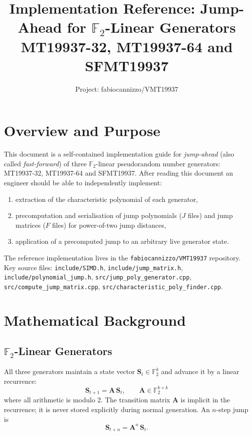 \documentclass{article}
\title{Implementation Reference: Jump-Ahead for $\mathbb{F}_2$-Linear Generators\\
\large MT19937-32, MT19937-64 and SFMT19937}
\author{Project: fabiocannizzo/VMT19937}
\date{}
\begin{document}
\maketitle
\tableofcontents
\newpage

\section{Overview and Purpose}

This document is a self-contained implementation guide for \emph{jump-ahead} (also called
\emph{fast-forward}) of three $\mathbb{F}_2$-linear pseudorandom number generators:
MT19937-32, MT19937-64 and SFMT19937.  After reading this document an engineer should be
able to independently implement:
\begin{enumerate}
  \item extraction of the characteristic polynomial of each generator,
  \item precomputation and serialisation of jump polynomials ($J$ files) and jump matrices
        ($F$ files) for power-of-two jump distances,
  \item application of a precomputed jump to an arbitrary live generator state.
\end{enumerate}

\noindent The reference implementation lives in the \texttt{fabiocannizzo/VMT19937} repository.
Key source files: \texttt{include/SIMD.h}, \texttt{include/jump\_matrix.h},
\texttt{include/polynomial\_jump.h}, \texttt{src/jump\_poly\_generator.cpp},
\texttt{src/compute\_jump\_matrix.cpp}, \texttt{src/characteristic\_poly\_finder.cpp}.

\section{Mathematical Background}

\subsection{$\mathbb{F}_2$-Linear Generators}

All three generators maintain a state vector $\mathbf{S}_t \in \mathbb{F}_2^k$ and
advance it by a linear recurrence:
\begin{equation}
  \mathbf{S}_{t+1} = \mathbf{A}\,\mathbf{S}_t, \qquad \mathbf{A} \in \mathbb{F}_2^{k\times k}
\end{equation}
where all arithmetic is modulo 2.  The transition matrix $\mathbf{A}$ is implicit in the
recurrence; it is never stored explicitly during normal generation.  An $n$-step jump is
\begin{equation}
  \mathbf{S}_{t+n} = \mathbf{A}^n\,\mathbf{S}_t.
\end{equation}
\end{document}
